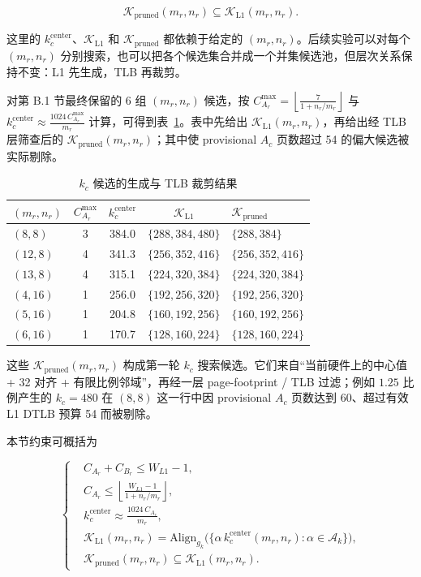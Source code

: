 \documentclass[a4paper,11pt,oneside]{article}
\begin{document}
$$
\mathcal{K}_{\mathrm{pruned}}(m_r,n_r) \subseteq \mathcal{K}_{\mathrm{L1}}(m_r,n_r).
$$

这里的 $k_c^{\text{center}}$、$\mathcal{K}_{\mathrm{L1}}$ 和 $\mathcal{K}_{\mathrm{pruned}}$ 都依赖于给定的 $(m_r,n_r)$。后续实验可以对每个 $(m_r,n_r)$ 分别搜索，也可以把各个候选集合并成一个并集候选池，但层次关系保持不变：L1 先生成，TLB 再裁剪。

对第 B.1 节最终保留的 6 组 $(m_r,n_r)$ 候选，按 $C_{A_r}^{\max}=\left\lfloor \frac{7}{1+n_r/m_r} \right\rfloor$ 与 $k_c^{\text{center}} \approx \frac{1024\,C_{A_r}^{\max}}{m_r}$ 计算，可得到表~\ref{tab:appendix_kc_candidates}。表中先给出 $\mathcal{K}_{\mathrm{L1}}(m_r,n_r)$，再给出经 TLB 层筛查后的 $\mathcal{K}_{\mathrm{pruned}}(m_r,n_r)$；其中使 provisional $A_c$ 页数超过 54 的偏大候选被实际剔除。

\begin{table}[H]
\centering
\begin{tabular}{lcccl}
\toprule
\textbf{$(m_r,n_r)$} & $C_{A_r}^{\max}$ & $k_c^{\text{center}}$ & \textbf{$\mathcal{K}_{\mathrm{L1}}$} & \textbf{$\mathcal{K}_{\mathrm{pruned}}$} \\
\midrule
$(8,8)$   & 3 & 384.0 & $\{288,384,480\}$ & $\{288,384\}$ \\
$(12,8)$  & 4 & 341.3 & $\{256,352,416\}$ & $\{256,352,416\}$ \\
$(13,8)$  & 4 & 315.1 & $\{224,320,384\}$ & $\{224,320,384\}$ \\
$(4,16)$  & 1 & 256.0 & $\{192,256,320\}$ & $\{192,256,320\}$ \\
$(5,16)$  & 1 & 204.8 & $\{160,192,256\}$ & $\{160,192,256\}$ \\
$(6,16)$  & 1 & 170.7 & $\{128,160,224\}$ & $\{128,160,224\}$ \\
\bottomrule
\end{tabular}
\caption{$k_c$ 候选的生成与 TLB 裁剪结果}
\label{tab:appendix_kc_candidates}
\end{table}

这些 $\mathcal{K}_{\mathrm{pruned}}(m_r,n_r)$ 构成第一轮 $k_c$ 搜索候选。它们来自“当前硬件上的中心值 + 32 对齐 + 有限比例邻域”，再经一层 page-footprint / TLB 过滤；例如 $1.25$ 比例产生的 $k_c=480$ 在 $(8,8)$ 这一行中因 provisional $A_c$ 页数达到 60、超过有效 L1 DTLB 预算 54 而被剔除。

本节约束可概括为

$$
\left\{
\begin{aligned}
&C_{A_r} + C_{B_r} \le W_{L1} - 1,\\
&C_{A_r} \le \left\lfloor \frac{W_{L1}-1}{1+n_r/m_r} \right\rfloor,\\
&k_c^{\text{center}} \approx \frac{1024\,C_{A_r}}{m_r},\\
&\mathcal{K}_{\mathrm{L1}}(m_r,n_r) = \mathrm{Align}_{g_k}\bigl(\{ \alpha\, k_c^{\text{center}}(m_r,n_r) : \alpha \in \mathcal{A}_k \}\bigr),\\
&\mathcal{K}_{\mathrm{pruned}}(m_r,n_r) \subseteq \mathcal{K}_{\mathrm{L1}}(m_r,n_r).
\end{aligned}
\right.
$$
\end{document}
